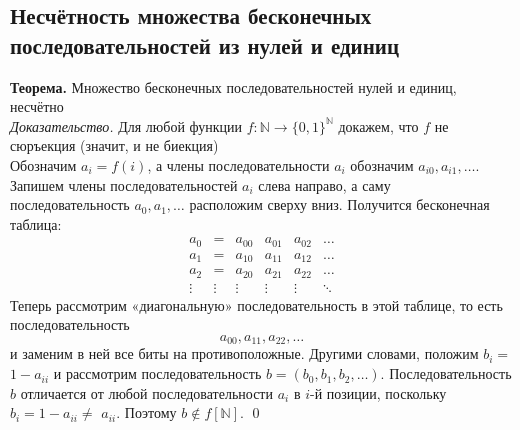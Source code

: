 \documentclass[a4paper]{article}
\begin{document}
\subsection{Несчётность множества бесконечных последовательностей из нулей и единиц}
\textbf{Теорема.} Множество бесконечных последовательностей нулей и единиц, несчётно\\[2mm]
\textit{Доказательство.} Для любой функции $f: \mathbb{N} \rightarrow\{0,1\}^{\mathbb{N}}$ докажем, что $f$ не сюръекция (значит, и не биекция)\\[2mm]
\label{sec:2.33} Обозначим $a_{i}=f(i)$, а члены последовательности $a_{i}$ обозначим $a_{i 0}, a_{i 1}, \ldots$. Запишем члены последовательностей $a_{i}$ слева направо, а саму последовательность $a_{0}, a_{1}, \ldots$ расположим сверху вниз. Получится бесконечная таблица:
$$
\begin{array}{cccccc}
a_{0} & = & a_{00} & a_{01} & a_{02} & \ldots \\
a_{1} & = & a_{10} & a_{11} & a_{12} & \ldots \\
a_{2} & = & a_{20} & a_{21} & a_{22} & \ldots \\
\vdots & \vdots & \vdots & \vdots & \vdots & \ddots
\end{array}
$$
 Теперь рассмотрим «диагональную» последовательность в этой таблице, то есть последовательность
$$
a_{00}, a_{11}, a_{22}, \ldots
$$
и заменим в ней все биты на противоположные. Другими словами, положим $b_{i}=$ $1-a_{i i}$ и рассмотрим последовательность $b=\left(b_{0}, b_{1}, b_{2}, \ldots\right)$. Последовательность $b$
отличается от любой последовательности $a_{i}$ в $i$-й позиции, поскольку $b_{i}=1-a_{i i} \neq$ $a_{i i}$. Поэтому $b \notin f[\mathbb{N}]$. \qed
\end{document}
